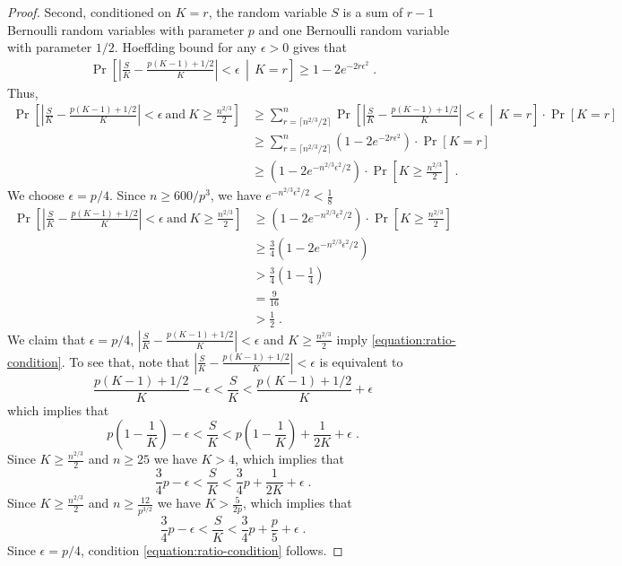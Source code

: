 \begin{proof}
Second, conditioned on $K=r$, the random variable $S$
is a sum of $r-1$ Bernoulli random variables with parameter $p$
and one Bernoulli random variable with parameter $1/2$. Hoeffding bound for any $\epsilon > 0$
gives that
\begin{align*}
\Pr \left[ \left| \frac{S}{K} - \frac{p(K - 1) + 1/2}{K} \right| < \epsilon \, \middle| \, K = r \right] \ge 1 - 2 e^{-2 r \epsilon^2} \; .
\end{align*}
Thus,
\begin{align*}
\Pr \left[ \left| \frac{S}{K} - \frac{p(K - 1) + 1/2}{K} \right| < \epsilon \ \text{and} \ K \ge \frac{n^{2/3}}{2} \right]
& \ge \sum_{r = \lceil n^{2/3} / 2 \rceil}^n \Pr \left[ \left| \frac{S}{K} - \frac{p(K - 1) + 1/2}{K} \right| < \epsilon  \, \middle| \,  K = r \right] \cdot \Pr[K = r] \\
& \ge \sum_{r = \lceil n^{2/3} / 2 \rceil}^n \left( 1 - 2 e^{-2 r \epsilon^2} \right) \cdot \Pr[K = r] \\
& \ge \left( 1 - 2 e^{-n^{2/3}  \epsilon^2 / 2} \right) \cdot \Pr \left[ K \ge \frac{n^{2/3}}{2} \right] \; .
\end{align*}
We choose $\epsilon = p/4$. Since $n \ge 600/p^3$, we have $e^{-n^{2/3}  \epsilon^2 / 2} < \frac{1}{8}$
\begin{align*}
\Pr \left[ \left| \frac{S}{K} - \frac{p(K - 1) + 1/2}{K} \right| < \epsilon \ \text{and} \ K \ge \frac{n^{2/3}}{2} \right]
& \ge \left( 1 - 2 e^{-n^{2/3}  \epsilon^2 / 2} \right) \cdot \Pr \left[ K \ge \frac{n^{2/3}}{2} \right] \\
& \ge \frac{3}{4} \left( 1 - 2 e^{-n^{2/3}  \epsilon^2 / 2} \right) \\
& > \frac{3}{4} \left( 1 - \frac{1}{4} \right) \\
& = \frac{9}{16}  \\
& > \frac{1}{2} \; .
\end{align*}
We claim that $\epsilon = p/4$,
$\left| \frac{S}{K} - \frac{p(K - 1) + 1/2}{K} \right| < \epsilon$
and $K \ge \frac{n^{2/3}}{2}$ imply \eqref{equation:ratio-condition}.
To see that, note that $\left| \frac{S}{K} - \frac{p(K - 1) + 1/2}{K} \right| < \epsilon$ is equivalent to
$$
\frac{p(K - 1) + 1/2}{K} - \epsilon < \frac{S}{K} < \frac{p(K - 1) + 1/2}{K} + \epsilon
$$
which implies that
$$
p \left(1 - \frac{1}{K} \right) - \epsilon < \frac{S}{K} < p \left(1 - \frac{1}{K} \right) + \frac{1}{2K} + \epsilon \; .
$$
Since $K \ge \frac{n^{2/3}}{2}$ and $n \ge 25$ we have $K > 4$, which implies that
$$
\frac{3}{4} p - \epsilon < \frac{S}{K} < \frac{3}{4} p + \frac{1}{2K} + \epsilon \; .
$$
Since $K \ge \frac{n^{2/3}}{2}$ and $n \ge \frac{12}{p^{3/2}}$ we have $K > \frac{5}{2p}$, which implies that
$$
\frac{3}{4} p - \epsilon < \frac{S}{K} < \frac{3}{4} p + \frac{p}{5} + \epsilon \; .
$$
Since $\epsilon = p/4$, condition \eqref{equation:ratio-condition} follows.
\end{proof}
